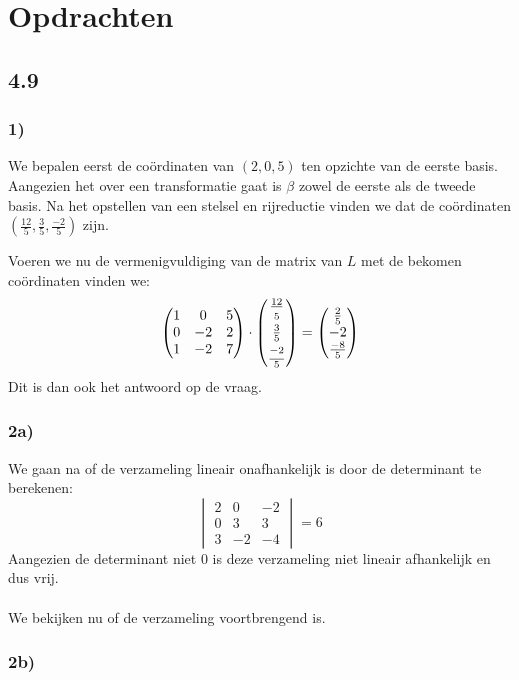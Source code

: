 \documentclass[lineaire_algebra_oplossingen.tex]{subfiles}
\begin{document}
\section{Opdrachten}

\subsection{4.9}
\subsubsection*{1)}
We bepalen eerst de co\"ordinaten van $(2,0,5)$ ten opzichte van de eerste basis. Aangezien het over een transformatie gaat is $\beta$ zowel de eerste als de tweede basis. 
Na het opstellen van een stelsel en rijreductie vinden we dat de co\"ordinaten $\left(\frac{12}{5},\frac{3}{5},\frac{-2}{5}\right)$ zijn.

Voeren we nu de vermenigvuldiging van de matrix van $L$ met de bekomen co\"ordinaten vinden we:\\
$$
\begin{pmatrix}
1&0&5\\
0&-2&2\\
1&-2&7
\end{pmatrix}
\cdot
\begin{pmatrix}
\frac{12}{\strut5}\\ \frac{3}{5}\\ \frac{\strut -2}{5}
\end{pmatrix}
=
\begin{pmatrix}
\strut \frac{2}{5}\\ -2\\ \strut \frac{-8}{5}
\end{pmatrix}
$$
Dit is dan ook het antwoord op de vraag.
\subsubsection*{2a)}
We gaan na of de verzameling lineair onafhankelijk is door de determinant te berekenen:
$$
\begin{vmatrix}
2 & 0 & -2\\
0&3&3\\
3&-2&-4
\end{vmatrix}
= 6
$$
Aangezien de determinant niet 0 is deze verzameling niet lineair afhankelijk en dus vrij.
\\
\\
We bekijken nu of de verzameling voortbrengend is.
\subsubsection*{2b)}
\end{document}
